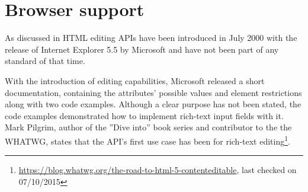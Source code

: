 

\section{Browser support}
\label{sec:edit_apis_browser_support}

As discussed in  HTML editing APIs have been introduced in July 2000 with the release of Internet Explorer 5.5 by Microsoft and have not been part of any standard of that time.


With the introduction of editing capabilities, Microsoft released a short documentation\cite{ac2}, containing the attributes' possible values and element restrictions along with two code examples. Although a clear purpose has not been stated, the code examples demonstrated how to implement rich-text input fields with it. Mark Pilgrim, author of the ''Dive into'' book series and contributor to the the WHATWG, states that the API's first use case has been for rich-text editing\footnote{\url{https://blog.whatwg.org/the-road-to-html-5-contenteditable}, last checked on 07/10/2015}. 





